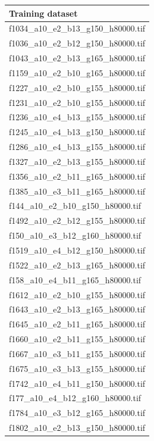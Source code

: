 \documentclass[12pt, twoside]{article}
\begin{document}
\begin{appendices}
	\begin{longtable}{|l|}
		\hline
		Training dataset \\ \hline 
		f1034\_a10\_e2\_b13\_g150\_h80000.tif \\ \hline 
		f1036\_a10\_e2\_b12\_g150\_h80000.tif \\ \hline 
		f1043\_a10\_e2\_b13\_g165\_h80000.tif \\ \hline 
		f1159\_a10\_e2\_b10\_g165\_h80000.tif \\ \hline 
		f1227\_a10\_e2\_b10\_g155\_h80000.tif \\ \hline 
		f1231\_a10\_e2\_b10\_g155\_h80000.tif \\ \hline 
		f1236\_a10\_e4\_b13\_g155\_h80000.tif \\ \hline 
		f1245\_a10\_e4\_b13\_g150\_h80000.tif \\ \hline 
		f1286\_a10\_e4\_b13\_g155\_h80000.tif \\ \hline 
		f1327\_a10\_e2\_b13\_g155\_h80000.tif \\ \hline 
		f1356\_a10\_e2\_b11\_g165\_h80000.tif \\ \hline 
		f1385\_a10\_e3\_b11\_g165\_h80000.tif \\ \hline 
		f144\_a10\_e2\_b10\_g150\_h80000.tif \\ \hline 
		f1492\_a10\_e2\_b12\_g155\_h80000.tif \\ \hline 
		f150\_a10\_e3\_b12\_g160\_h80000.tif \\ \hline 
		f1519\_a10\_e4\_b12\_g150\_h80000.tif \\ \hline 
		f1522\_a10\_e2\_b13\_g165\_h80000.tif \\ \hline 
		f158\_a10\_e4\_b11\_g165\_h80000.tif \\ \hline 
		f1612\_a10\_e2\_b10\_g155\_h80000.tif \\ \hline 
		f1643\_a10\_e2\_b13\_g165\_h80000.tif \\ \hline 
		f1645\_a10\_e2\_b11\_g165\_h80000.tif \\ \hline 
		f1660\_a10\_e2\_b11\_g155\_h80000.tif \\ \hline 
		f1667\_a10\_e3\_b11\_g155\_h80000.tif \\ \hline 
		f1675\_a10\_e3\_b13\_g155\_h80000.tif \\ \hline 
		f1742\_a10\_e4\_b11\_g150\_h80000.tif \\ \hline 
		f177\_a10\_e4\_b12\_g160\_h80000.tif \\ \hline 
		f1784\_a10\_e3\_b12\_g165\_h80000.tif \\ \hline 
		f1802\_a10\_e2\_b13\_g150\_h80000.tif \\ \hline 

\end{longtable}
\end{appendices}
\end{document}
